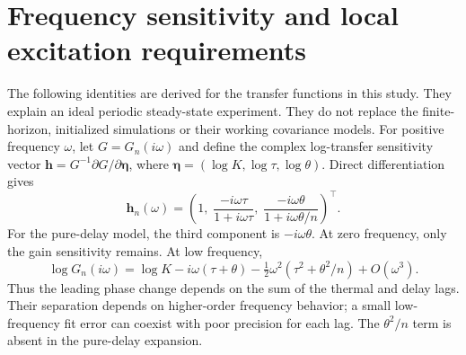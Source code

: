 \documentclass[11pt]{article}
\begin{document}
\section{Frequency sensitivity and local excitation requirements}
\label{sec:frequency-information}
The following identities are derived for the transfer functions in this study.
They explain an ideal periodic steady-state experiment. They do not replace
the finite-horizon, initialized simulations or their working covariance models.
For positive frequency $\omega$, let $G=G_n(i\omega)$ and define the complex
log-transfer sensitivity vector $\bm h=G^{-1}\partial G/\partial\bm\eta$,
where $\bm\eta=(\log K,\log\tau,\log\theta)$. Direct differentiation gives
\begin{equation}
 \bm h_n(\omega)=\left(
 1,\;\frac{-i\omega\tau}{1+i\omega\tau},\;
 \frac{-i\omega\theta}{1+i\omega\theta/n}
 \right)^\top.
 \label{eq:frequency-sensitivities}
\end{equation}
For the pure-delay model, the third component is $-i\omega\theta$.
At zero frequency, only the gain sensitivity remains. At low frequency,
\[
 \log G_n(i\omega)=\log K-i\omega(\tau+\theta)
 -\tfrac12\omega^2(\tau^2+\theta^2/n)+O(\omega^3).
\]
Thus the leading phase change depends on the sum of the thermal and delay
lags. Their separation depends on higher-order frequency behavior; a small
low-frequency fit error can coexist with poor precision for each lag.
The $\theta^2/n$ term is absent in the pure-delay expansion.
\end{document}
